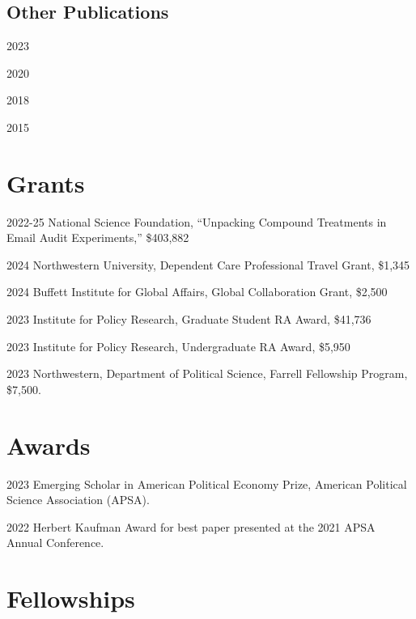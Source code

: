 \documentclass[12pt,letterpaper]{report}
\begin{document}
    \subsection*{Other Publications}
    \begin{tablist}
    \item[2023] \tab{}
    \item[2020] \tab{}
    \item[2018] \tab{}
    \item[2015] \tab{}
    \end{tablist}
	
    \section*{Grants}
	\begin{tablist}
	\item[2022-25]	\tab{}National Science Foundation, ``Unpacking Compound Treatments in Email Audit Experiments,'' \$403,882
		\item[2024] \tab{}Northwestern University, Dependent Care Professional Travel Grant, \$1,345
	\item[2024] \tab{}Buffett Institute for Global Affairs, Global Collaboration Grant, \$2,500
	\item[2023] \tab{}Institute for Policy Research, Graduate Student RA Award, \$41,736 
	\item[2023]	\tab{}Institute for Policy Research, Undergraduate RA Award, \$5,950
	\item[2023]	\tab{}Northwestern, Department of Political Science, Farrell Fellowship Program, \$7,500.
	\end{tablist}
	
	
    \section*{Awards}
	
	\begin{tablist}
	\item[2023] \tab{}Emerging Scholar in American Political Economy Prize, American Political Science Association (APSA).
	\item[2022] \tab{}Herbert Kaufman Award for best paper presented at the 2021 APSA Annual Conference.
	\end{tablist}
    
    \section*{Fellowships}
    
\end{document}
